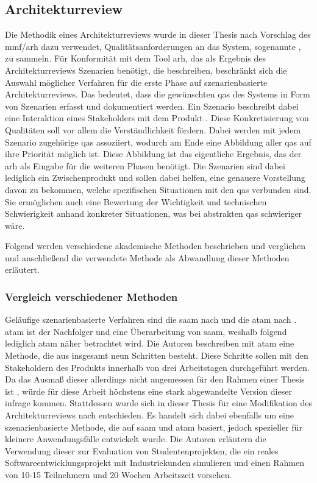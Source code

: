 \subsection{Architekturreview}
\label{sec:methodik-architekturreview}

Die Methodik eines Architekturreviews wurde in dieser Thesis nach Vorschlag des \gls{mmf}/\gls{arh} dazu verwendet, Qualitätsanforderungen an das System, sogenannte , zu sammeln.
Für Konformität mit dem Tool \gls{arh}, das als Ergebnis des Architekturreviews Szenarien benötigt, die  beschreiben, beschränkt sich die Auswahl möglicher Verfahren für die erste Phase auf szenarienbasierte Architekturreviews.
Das bedeutet, dass die gewünschten \glspl{qa} des Systems in Form von Szenarien erfasst und dokumentiert werden.
Ein Szenario beschreibt dabei eine Interaktion eines Stakeholders mit dem Produkt \cite{kazman_2000}.
Diese Konkretisierung von Qualitäten soll vor allem die Verständlichkeit fördern.
Dabei werden mit jedem Szenario zugehörige \glspl{qa} assoziiert, wodurch am Ende eine Abbildung aller \glspl{qa} auf ihre Priorität möglich ist.
Diese Abbildung ist das eigentliche Ergebnis, das der \gls{arh} als Eingabe für die weiteren Phasen benötigt.
Die Szenarien sind dabei lediglich ein Zwischenprodukt und sollen dabei helfen, eine genauere Vorstellung davon zu bekommen, welche spezifischen Situationen mit den \glspl{qa} verbunden sind.
Sie ermöglichen auch eine Bewertung der Wichtigkeit und technischen Schwierigkeit anhand konkreter Situationen, was bei abstrakten \glspl{qa} schwieriger wäre.

Folgend werden verschiedene akademische Methoden beschrieben und verglichen und anschließend die verwendete Methode als Abwandlung dieser Methoden erläutert.

\subsubsection{Vergleich verschiedener Methoden}
\label{sec:atam-saam-svahnberg}

Geläufige szenarienbasierte Verfahren sind die \gls{saam} nach  und die \gls{atam} nach .
\gls{atam} ist der Nachfolger und eine Überarbeitung von \gls{saam}, weshalb folgend lediglich \gls{atam} näher betrachtet wird.
Die Autoren beschreiben mit \gls{atam} eine Methode, die aus insgesamt neun Schritten besteht.
Diese Schritte sollen mit den Stakeholdern des Produkts innerhalb von drei Arbeitstagen durchgeführt werden.
Da das Ausmaß dieser allerdings nicht angemessen für den Rahmen einer Thesis ist \cite{master-marvin-knodel}, würde für diese Arbeit höchstens eine stark abgewandelte Version dieser infrage kommen.
Stattdessen wurde sich in dieser Thesis für eine Modifikation des Architekturreviews nach  entschieden.
Es handelt sich dabei ebenfalls um eine szenarienbasierte Methode, die auf \gls{saam} und \gls{atam} basiert, jedoch spezieller für kleinere Anwendungsfälle entwickelt wurde.
Die Autoren erläutern die Verwendung dieser zur Evaluation von Studentenprojekten, die ein reales Softwareentwicklungsprojekt mit Industriekunden simulieren und einen Rahmen von 10-15 Teilnehmern und 20 Wochen Arbeitszeit vorsehen.

